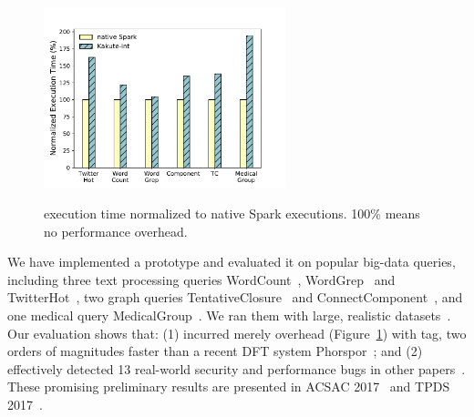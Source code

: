 \begin{figure}
  \vspace{-.1in}
  \includegraphics[width=7cm]{figures/time_overhead.pdf}\\
  \vspace{-.3in}
  \caption{\kakute execution time normalized to native Spark executions. 100\% 
means no performance overhead.}
  \label{fig:scalability}
\end{figure}

 We have implemented a \kakute prototype 
and evaluated it on \appeval popular big-data queries, including three text 
processing queries WordCount~\cite{spark:example}, 
WordGrep~\cite{newt:socc13} and TwitterHot~\cite{spark:example}, two graph 
queries TentativeClosure~\cite{spark:example}
and ConnectComponent~\cite{spark:example}, and one medical query
MedicalGroup~\cite{pigmix}.
We ran them with large, realistic datasets~\cite{vldb16:output, 
icse16:bigdebug, vldb15:titian}.
Our evaluation shows that: (1) \kakute 
incurred merely \timeavg overhead (Figure~\ref{fig:scalability}) with 
 tag, two orders of magnitudes faster than a recent DFT 
system Phorspor~\cite{oo14:phosphor}; and (2) \kakute effectively 
detected 13 real-world security and performance bugs in other 
papers~\cite{arthur:dave2013,icse16:bigdebug,airavat:nsdi10}. These promising 
preliminary results are presented in ACSAC 2017~\cite{kakute:acsac17} and TPDS 
2017~\cite{confluence:tpds17}.












